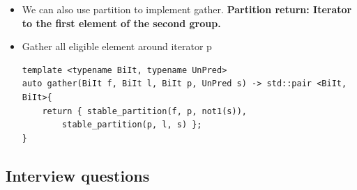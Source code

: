 \documentclass[a4paper,11pt,twoside]{book}
\begin{document}
\begin{itemize}
	\item We can also use partition to implement gather. \textbf{Partition return: Iterator to the first element of the second group.}

	\item Gather all eligible element around iterator p
\begin{lstlisting}[numbers=none]
template <typename BiIt, typename UnPred> 
auto gather(BiIt f, BiIt l, BiIt p, UnPred s) -> std::pair <BiIt, BiIt>{
	return { stable_partition(f, p, not1(s)), 
		stable_partition(p, l, s) };
}		
\end{lstlisting}


\end{itemize}

\subsection{Interview questions}
\end{document}
